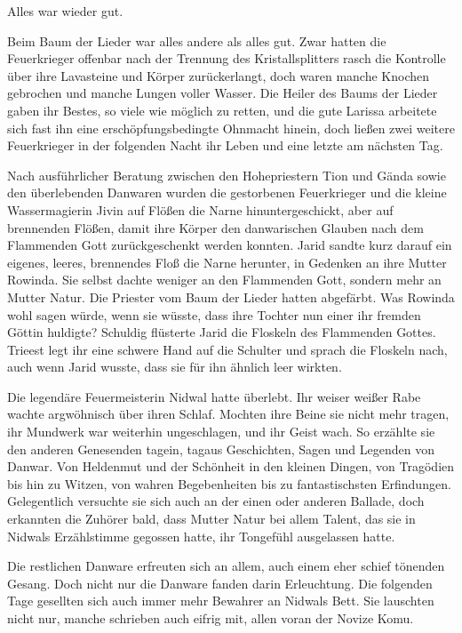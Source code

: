 Alles war wieder gut.\bigskip







Beim Baum der Lieder war alles andere als alles gut. Zwar hatten die Feuerkrieger offenbar nach der Trennung des Kristallsplitters rasch die Kontrolle über ihre Lavasteine und Körper zurückerlangt, doch waren manche Knochen gebrochen und manche Lungen voller Wasser. Die Heiler des Baums der Lieder gaben ihr Bestes, so viele wie möglich zu retten, und die gute Larissa arbeitete sich fast ihn eine erschöpfungsbedingte Ohnmacht hinein, doch ließen zwei weitere Feuerkrieger in der folgenden Nacht ihr Leben und eine letzte am nächsten Tag.

Nach ausführlicher Beratung zwischen den Hohepriestern Tion und Gända sowie den überlebenden Danwaren wurden die gestorbenen Feuerkrieger und die kleine Wassermagierin Jivin auf Flößen die Narne hinuntergeschickt, aber auf brennenden Flößen, damit ihre Körper den danwarischen Glauben nach dem Flammenden Gott zurückgeschenkt werden konnten. Jarid sandte kurz darauf ein eigenes, leeres, brennendes Floß die Narne herunter, in Gedenken an ihre Mutter Rowinda. Sie selbst dachte weniger an den Flammenden Gott, sondern mehr an Mutter Natur. Die Priester vom Baum der Lieder hatten abgefärbt. Was Rowinda wohl sagen würde, wenn sie wüsste, dass ihre Tochter nun einer ihr fremden Göttin huldigte? Schuldig flüsterte Jarid die Floskeln des Flammenden Gottes. Trieest legt ihr eine schwere Hand auf die Schulter und sprach die Floskeln nach, auch wenn Jarid wusste, dass sie für ihn ähnlich leer wirkten.

Die legendäre Feuermeisterin Nidwal hatte überlebt. Ihr weiser weißer Rabe wachte argwöhnisch über ihren Schlaf. Mochten ihre Beine sie nicht mehr tragen, ihr Mundwerk war weiterhin ungeschlagen, und ihr Geist wach. So erzählte sie den anderen Genesenden tagein, tagaus Geschichten, Sagen und Legenden von Danwar. Von Heldenmut und der Schönheit in den kleinen Dingen, von Tragödien bis hin zu Witzen, von wahren Begebenheiten bis zu fantastischsten Erfindungen. Gelegentlich versuchte sie sich auch an der einen oder anderen Ballade, doch erkannten die Zuhörer bald, dass Mutter Natur bei allem Talent, das sie in Nidwals Erzählstimme gegossen hatte, ihr Tongefühl ausgelassen hatte.

Die restlichen Danware erfreuten sich an allem, auch einem eher schief tönenden Gesang. Doch nicht nur die Danware fanden darin Erleuchtung. Die folgenden Tage gesellten sich auch immer mehr Bewahrer an Nidwals Bett. Sie lauschten nicht nur, manche schrieben auch eifrig mit, allen voran der Novize Komu.

